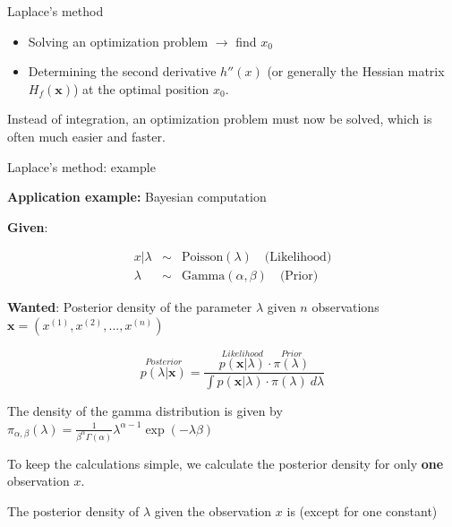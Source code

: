 \begin{vbframe}{Laplace's method}
\begin{itemize}
\item Solving an optimization problem $\to$ find $x_0$
\item Determining the second derivative $h''(x)$ (or generally the Hessian matrix $H_f(\bm{x})$) at the optimal position $x_0$.
\end{itemize}

Instead of integration, an optimization problem must now be solved, which is often much easier and faster.



\end{vbframe}

\begin{vbframe}{Laplace's method: example}

\textbf{Application example:} Bayesian computation

\lz

\textbf{Given}:

\vspace*{-0.8cm}
\begin{eqnarray*}
x | \lambda &\sim& \text{Poisson}(\lambda) \quad \text{(Likelihood)}\\
\lambda &\sim& \text{Gamma}(\alpha, \beta) \quad \text{(Prior)}
\end{eqnarray*}

\textbf{Wanted}: Posterior density of the parameter $\lambda$ given $n$ observations $\bm{x} = \left(x^{(1)}, x^{(2)}, ..., x^{(n)}\right)$

$$
\overset{Posterior}{p(\lambda | \bm{x})} = \frac{\overset{Likelihood}{p(\bm{x} | \lambda)} \cdot \overset{Prior}{\pi(\lambda)}}{\int p(\bm{x} | \lambda) \cdot \pi(\lambda) ~ d\lambda}
$$

\vfill

\begin{footnotesize}
The density of the gamma distribution is given by $\pi_{\alpha, \beta}(\lambda) = \frac{1}{\beta^\alpha\Gamma(\alpha)}\lambda^{\alpha-1}\exp(-\lambda \beta)$
\end{footnotesize}

\framebreak

To keep the calculations simple, we calculate the posterior density for only \textbf{one} observation $x$.

\lz

The posterior density of $\lambda$ given the observation $x$ is (except for one constant)


\end{vbframe}
